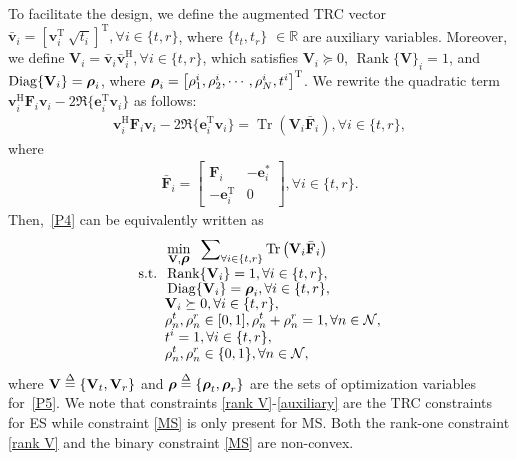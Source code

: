\documentclass[12pt, draftclsnofoot, onecolumn]{IEEEtran}
\DeclareMathOperator{\Diag}{Diag}
\DeclareMathOperator{\rank}{Rank}
\DeclareMathOperator{\tr}{Tr}
\newcommand{\bm}[1]{\mbox{\boldmath{$#1$}}}
\begin{document}
To facilitate the design, we define the augmented TRC vector $\bar{\mathbf{v}}_i=\left[\mathbf{v}_i^\mathrm{T} \ \sqrt{t_i}\right]^\mathrm{T}, \forall i\in\{t,r\}$, where $\{t_t, t_r\}$ $\in\mathbb{R}$ are auxiliary variables. Moreover, we define ${\mathbf{V}}_i=\bar{\mathbf{v}}_i\bar{\mathbf{v}}_i^\mathrm{H}, \forall i\in\{t,r\}$, which satisfies ${\mathbf{V}}_i\succeq 0$, $\rank\{{\mathbf{V}}\}_i=1$, and $\Diag\{{\mathbf{V}}_i\}={\bm{\rho}}_i$, where ${\bm{\rho}}_i=\left[\rho_{1}^i,\rho_{2}^i,\cdots,\rho_{N}^i,t^i\right]^\mathrm{T}$. We rewrite the quadratic term $\mathbf{v}_i^{\mathrm{H}}\mathbf{F}_i\mathbf{v}_i-2\Re\{\mathbf{e}_i^{\mathrm{T}}\mathbf{v}_i\}$ as follows:
\begin{equation}
\begin{aligned}
\mathbf{v}_i^{\mathrm{H}}\mathbf{F}_i\mathbf{v}_i-2\Re\{\mathbf{e}_i^{\mathrm{T}}\mathbf{v}_i\}=\tr\left({\mathbf{V}}_i\bar{\mathbf{F}}_i\right), \forall i \in \{t,r\},
\end{aligned}
\end{equation}
where 
\begin{equation}
\begin{aligned}
\bar{\mathbf{F}}_i=\begin{bmatrix}
\mathbf{F}_i & -\mathbf{e}_i^{*} \\
-\mathbf{e}_i^\mathrm{T} & 0 
\end{bmatrix}, \forall i \in \{t,r\}.
\end{aligned}
\end{equation}
Then,~\eqref{P4} can be equivalently written as
\begin{subequations}\label{P5}
\begin{align}
&\mathop {\min }\limits_{ {{\mathbf{V}},{\bm{\rho}}} } \;\;\sum\nolimits_{\forall i \in \{t,r\}}\tr\left({\mathbf{V}}_i\bar{\mathbf{F}}_i\right)  \\[-0.15cm]
\label{rank V}{\rm{s.t.}}\;\;&\rank\{{\mathbf{V}}_i\}=1, \forall i \in\{t,r\},\\[-0.15cm]
\label{amplitude1}&\Diag\{{\mathbf{V}}_i\}={\bm{\rho}}_i, \forall i \in\{t,r\},\\[-0.15cm]
\label{semi V}&{\mathbf{V}}_i\succeq 0, \forall i \in\{t,r\},\\[-0.15cm]
\label{amplitude2}&\rho_n^t, \rho_n^r \in [0,1], \rho_n^t+\rho_n^r=1, \forall n\in \mathcal{N},\\[-0.15cm]
\label{auxiliary}&t^i=1, \forall i \in\{t,r\},\\[-0.15cm]
\label{MS}&\rho_n^t, \rho_n^r \in\{0,1\}, \forall n \in \mathcal{N},
\end{align}
\end{subequations} 
where $\mathbf{V}\buildrel \Delta \over =\{{\mathbf{V}}_t,{\mathbf{V}}_r\}$ and $\bm{\rho}\buildrel \Delta \over =\{{\bm{\rho}}_t,{\bm{\rho}}_r\}$ are the sets of optimization variables for~\eqref{P5}. We note that constraints \eqref{rank V}-\eqref{auxiliary} are the TRC constraints for ES while constraint \eqref{MS} is only present for MS. Both the rank-one constraint \eqref{rank V} and the binary constraint \eqref{MS} are non-convex.
\end{document}
